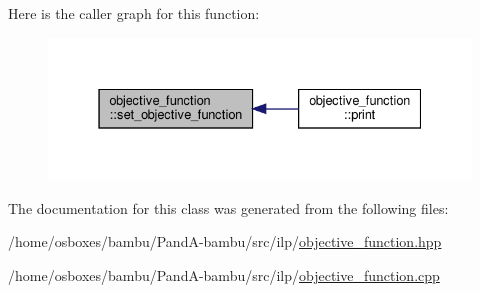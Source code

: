 Here is the caller graph for this function\+:
\nopagebreak
\begin{figure}[H]
\begin{center}
\leavevmode
\includegraphics[width=331pt]{d0/da1/classobjective__function_acdfb59b7a754ee183250696c6c55b5ae_icgraph}
\end{center}
\end{figure}


The documentation for this class was generated from the following files\+:\begin{DoxyCompactItemize}
\item 
/home/osboxes/bambu/\+Pand\+A-\/bambu/src/ilp/\hyperlink{objective__function_8hpp}{objective\+\_\+function.\+hpp}\item 
/home/osboxes/bambu/\+Pand\+A-\/bambu/src/ilp/\hyperlink{objective__function_8cpp}{objective\+\_\+function.\+cpp}\end{DoxyCompactItemize}
